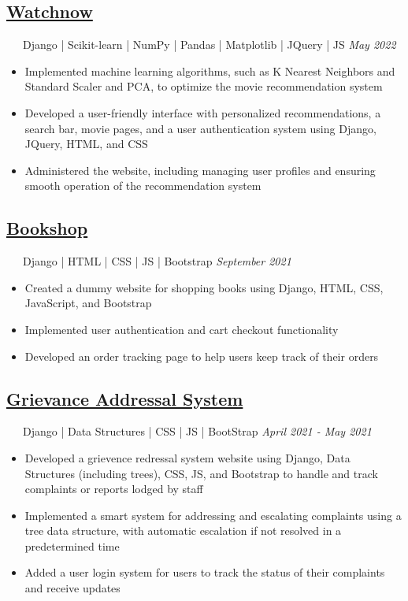 \documentclass[12pt]{article}
\begin{document}
\subsection*{\href{https://github.com/prabhavagrawal7/watchnow/}{Watchnow}}~~~Django | Scikit-learn | NumPy | Pandas | Matplotlib | JQuery | JS \hfill\textit{May 2022}\\
\begin{itemize}[leftmargin=*, topsep=0.5pt,itemsep=0.5pt,partopsep=0.5pt, parsep=0.5pt]
	\item Implemented machine learning algorithms, such as K Nearest Neighbors and Standard Scaler and PCA, to optimize the movie recommendation system
	\item Developed a user-friendly interface with personalized recommendations, a search bar, movie pages, and a user authentication system using Django, JQuery, HTML, and CSS
	\item Administered the website, including managing user profiles and ensuring smooth operation of the recommendation system
\end{itemize}

\subsection*{\href{https://github.com/prabhavagrawal7/bookshop}{Bookshop}}~~~Django | HTML | CSS | JS | Bootstrap \hfill\textit{September 2021}\\
\begin{itemize}[leftmargin=*, topsep=0.5pt,itemsep=1pt,partopsep=0.5pt, parsep=0.5pt]
	\item Created a dummy website for shopping books using Django, HTML, CSS, JavaScript, and Bootstrap
	\item Implemented user authentication and cart checkout functionality
	\item Developed an order tracking page to help users keep track of their orders
\end{itemize}

\subsection*{\href{https://github.com/prabhavagrawal7/grievance-addressal-system}{Grievance Addressal System}}~~~Django | Data Structures | CSS | JS | BootStrap \hfill \textit{April 2021 - May 2021} \\
\begin{itemize}[leftmargin=*, topsep=0.5pt,itemsep=0.5pt,partopsep=0.5pt, parsep=0.5pt]
	\item Developed a grievence redressal system website using Django, Data Structures (including trees), CSS, JS, and Bootstrap to handle and track complaints or reports lodged by staff
	\item Implemented a smart system for addressing and escalating complaints using a tree data structure, with automatic escalation if not resolved in a predetermined time
\item Added a user login system for users to track the status of their complaints and receive updates
\end{itemize}
\end{document}
